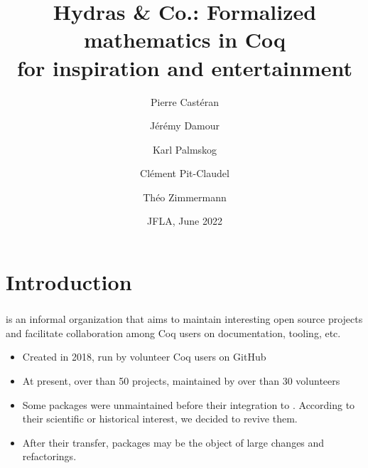 \documentclass[10pt, fleqn]{beamer}
\title{Hydras \& Co.: Formalized mathematics in Coq\\
  for inspiration and entertainment
}
\date{JFLA, June 2022}
\author{
  Pierre Castéran \inst{1}
  \and
  Jérémy Damour \inst{2}
  \and
  Karl Palmskog \inst{3}
  \and Clément Pit-Claudel \inst{4}
  \and Théo Zimmermann \inst{5}
}
\institute{
  Univ. Bordeaux, CNRS, Bordeaux INP, LaBRI, UMR 5800, F-33400 Talence, France  %
  \and
  Univ. de Paris, F-75013 Paris, France
  \and
  KTH Royal Institute of Technology, Stockholm, Sweden
  \and
  MIT CSAIL, Cambridge, Massachusetts, USA
  \and
  Inria, Univ. de Paris, CNRS, IRIF, UMR 8243, F-75013 Paris, France
}
\begin{document}

\begin{frame}
  \maketitle
\end{frame}

\begin{frame}
  \tableofcontents
\end{frame}
\section{Introduction}
\begin{frame}
    \frametitle{\community}
    \begin{block}{}
      \community is an informal organization that aims to maintain interesting open source \coq projects and facilitate collaboration among Coq users on documentation, tooling, etc.
      \begin{itemize}
      \item Created in 2018,  run by volunteer Coq users on GitHub
      \item At present, over than 50 projects, maintained by over than 30 volunteers
      \item Some packages were unmaintained before their integration to \community. According to their scientific or historical interest, we decided to revive them.
        \item After their transfer, packages may be the object of large changes  and refactorings.
      \end{itemize}
    \end{block}
  \end{frame}
\end{document}
